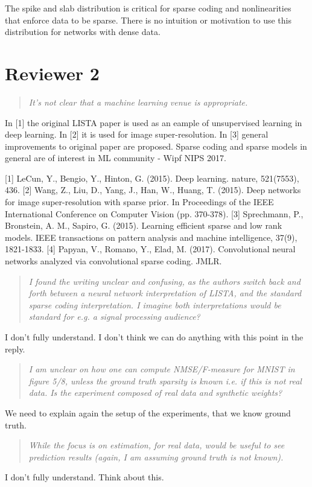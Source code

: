 \documentclass{article}
\begin{document}
The spike and slab distribution is critical for sparse coding and nonlinearities that enforce data to be sparse. There is no intuition or motivation to use this distribution for networks with dense data.

\section*{Reviewer 2}
\begin{quote}
\textit{It's not clear that a machine learning venue is appropriate.}
\end{quote}
In [1] the original LISTA paper is used as an eample of unsupervised learning in deep learning. In [2] it is used for image super-resolution. In [3] general improvements to original paper are proposed. Sparse coding and sparse models in general are of interest in ML community - Wipf NIPS 2017.

[1] LeCun, Y., Bengio, Y., Hinton, G. (2015). Deep learning. nature, 521(7553), 436.
[2] Wang, Z., Liu, D., Yang, J., Han, W., Huang, T. (2015). Deep networks for image super-resolution with sparse prior. In Proceedings of the IEEE International Conference on Computer Vision (pp. 370-378).
[3] Sprechmann, P., Bronstein, A. M., Sapiro, G. (2015). Learning efficient sparse and low rank models. IEEE transactions on pattern analysis and machine intelligence, 37(9), 1821-1833.
[4] Papyan, V., Romano, Y., Elad, M. (2017). Convolutional neural networks analyzed via convolutional sparse coding. JMLR.

\begin{quote}
\textit{I found the writing unclear and confusing, as the authors switch back and forth between a neural network interpretation of LISTA, and the standard sparse coding interpretation. I imagine both interpretations would be standard for e.g. a signal processing audience?}
\end{quote}
I don't fully understand. I don't think we can do anything with this point in the reply.

\begin{quote}
\textit{I am unclear on how one can compute NMSE/F-measure for MNIST in figure 5/8, unless the ground truth sparsity is known i.e. if this is not real data. Is the experiment composed of real data and synthetic weights?}
\end{quote}
We need to explain again the setup of the experiments, that we know ground truth.

\begin{quote}
\textit{While the focus is on estimation, for real data, would be useful to see prediction results (again, I am assuming ground truth is not known).}
\end{quote}
I don't fully understand. Think about this.
\end{document}
